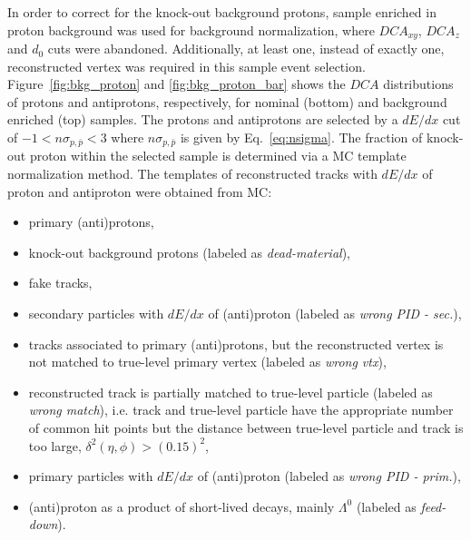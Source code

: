 In order to correct for the knock-out background protons, sample enriched in proton background  was used for background normalization, where $DCA_{xy}$, $DCA_z$ and $d_0$ cuts were abandoned. Additionally, at least one, instead of exactly one,  reconstructed vertex was required in this sample event selection.  Figure~\ref{fig:bkg_proton} and \ref{fig:bkg_proton_bar} shows the $DCA$ distributions of protons and antiprotons, respectively, for  nominal (bottom) and background enriched (top) samples. The protons and antiprotons are selected by a $dE/dx$ cut of $-1 < n\sigma_{p,\bar{p}} < 3$ where $n\sigma_{p,\bar{p}}$ is given by Eq.~\ref{eq:nsigma}. The fraction of knock-out proton within the selected sample is determined via a MC template normalization method. The templates of reconstructed tracks with $dE/dx$ of proton and antiproton were obtained from MC:
\begin{itemize}
	\item primary (anti)protons,
	\item knock-out background protons (labeled as \textit{dead-material}),
	\item fake tracks,
	\item secondary particles with $dE/dx$ of (anti)proton (labeled as \textit{wrong PID - sec.}),
	\item tracks associated to primary (anti)protons, but the reconstructed vertex is not matched to true-level primary vertex (labeled as \textit{wrong vtx}),
	\item reconstructed track is partially matched to true-level particle (labeled as \textit{wrong match}), i.e.  track and true-level particle have the appropriate number of common hit points but the distance between true-level particle and track is too large, $\delta^2\left(\eta,\phi\right)>\left(0.15\right)^2$,
	\item primary particles with $dE/dx$ of (anti)proton (labeled as \textit{wrong PID - prim.}),
	\item (anti)proton as a product of short-lived decays, mainly $\Lambda^0$ (labeled as \textit{feed-down}).
\end{itemize}

